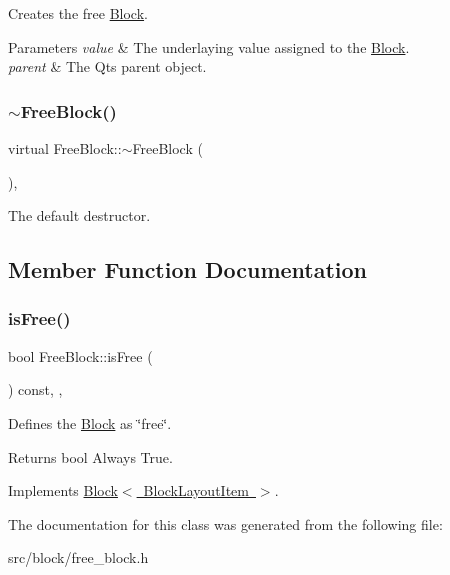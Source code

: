Creates the free \mbox{\hyperlink{class_block}{Block}}. 


\begin{DoxyParams}{Parameters}
{\em value} & The underlaying value assigned to the \mbox{\hyperlink{class_block}{Block}}. \\
\hline
{\em parent} & The Qt\textquotesingle{}s parent object. \\
\hline
\end{DoxyParams}
\mbox{\label{class_free_block_a7bd1edc9b556e577949cb2ec97b4f817}} 
\subsubsection{\texorpdfstring{$\sim$FreeBlock()}{~FreeBlock()}}
{\footnotesize\ttfamily virtual Free\+Block\+::$\sim$\+Free\+Block (\begin{DoxyParamCaption}{ }\end{DoxyParamCaption})\hspace{0.3cm}{\ttfamily [virtual]}, {\ttfamily [default]}}



The default destructor. 



\subsection{Member Function Documentation}
\mbox{\label{class_free_block_a76d3f40934d42c566095ee2f1386eac5}} 
\subsubsection{\texorpdfstring{isFree()}{isFree()}}
{\footnotesize\ttfamily bool Free\+Block\+::is\+Free (\begin{DoxyParamCaption}{ }\end{DoxyParamCaption}) const\hspace{0.3cm}{\ttfamily [inline]}, {\ttfamily [override]}, {\ttfamily [virtual]}}



Defines the \mbox{\hyperlink{class_block}{Block}} as \char`\"{}free\char`\"{}. 

\begin{DoxyReturn}{Returns}
bool Always True. 
\end{DoxyReturn}


Implements \mbox{\hyperlink{class_block_a795e0536746b840286cb1e74487311a9}{Block$<$ Block\+Layout\+Item $>$}}.



The documentation for this class was generated from the following file\+:\begin{DoxyCompactItemize}
\item 
src/block/free\+\_\+block.\+h\end{DoxyCompactItemize}

